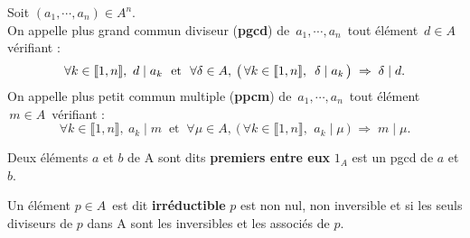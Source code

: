 Soit \((a_1,\cdots,a_n)\in A^n\).\vspace{0.1cm}\\
On appelle plus grand commun diviseur (\textbf{pgcd}) de \(\,a_1,\cdots,a_n\,\) tout élément $\,d\in\! A\,$ vérifiant :\vspace{-0.3cm}
\[\forall k\in \llbracket 1,n \rrbracket,\ d\mid a_k \ \text{ et }\ \forall\delta \in A,\: \bigl(\,\forall k\in \llbracket 1,n \rrbracket,\ \, \delta \mid a_k\,\bigr)\;\Rightarrow\; \delta\mid d.\vspace{0.1cm}\]
On appelle plus petit commun multiple (\textbf{ppcm}) de \(\,a_1,\cdots,a_n\,\) tout élément $\,m\in \!A\,$ vérifiant :\vspace{-0.3cm}
\[\forall k\in \llbracket 1,n \rrbracket,\ a_k\mid m \ \text{ et }\ \forall \mu\in A,\: \bigl(\, \forall k\in \llbracket 1,n \rrbracket,\ \,a_k\mid \mu\,\bigr)\;\Rightarrow\; m\mid \mu.\]

\vspace{1.5cm}

Deux éléments $a$ et $b$ de A sont dits \textbf{premiers entre eux} \ssi $1_A$ est un pgcd de $a$ et $b$.

\vspace{1.3cm}

Un élément $p\in\! A\,$ est dit \textbf{irréductible} \ssi $p$ est non nul, non inversible et si les seuls diviseurs de $p$ dans A sont les inversibles et les associés de $p$.

\vspace{1.4cm}